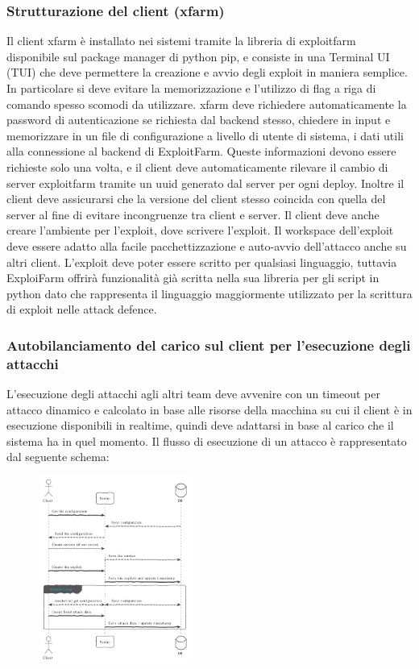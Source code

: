 \documentclass[11pt]{article}
\begin{document}
\subsubsection{Strutturazione del client (xfarm)}
Il client xfarm è installato nei sistemi tramite la libreria di exploitfarm disponibile sul package manager di python pip, e consiste in una Terminal UI (TUI) che deve permettere la creazione e avvio degli exploit in maniera semplice. In particolare si deve evitare la memorizzazione e l'utilizzo di flag a riga di comando spesso scomodi da utilizzare. xfarm deve richiedere automaticamente la password di autenticazione se richiesta dal backend stesso, chiedere in input e memorizzare in un file di configurazione a livello di utente di sistema, i dati utili alla connessione al backend di ExploitFarm. Queste informazioni devono essere richieste solo una volta, e il client deve automaticamente rilevare il cambio di server exploitfarm tramite un uuid generato dal server per ogni deploy. Inoltre il client deve assicurarsi che la versione del client stesso coincida con quella del server al fine di evitare incongruenze tra client e server. Il client deve anche creare l'ambiente per l'exploit, dove scrivere l'exploit. Il workspace dell'exploit deve essere adatto alla facile pacchettizzazione e auto-avvio dell'attacco anche su altri client. L'exploit deve poter essere scritto per qualsiasi linguaggio, tuttavia ExploiFarm offrirà funzionalità già scritta nella sua libreria per gli script in python dato che rappresenta il linguaggio maggiormente utilizzato per la scrittura di exploit nelle attack defence.
\subsubsection{Autobilanciamento del carico sul client per l'esecuzione degli attacchi}
L'esecuzione degli attacchi agli altri team deve avvenire con un timeout per attacco dinamico e calcolato in base alle risorse della macchina su cui il client è in esecuzione disponibili in realtime, quindi deve adattarsi in base al carico che il sistema ha in quel momento.
Il flusso di esecuzione di un attacco è rappresentato dal seguente schema:
\begin{figure}[H]
	\centering
	\includegraphics[width=0.45\textwidth]{attack_sequence.png}
\end{figure}
\end{document}
